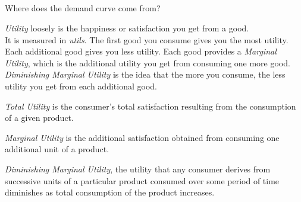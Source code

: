 \subsection{}
Where does the demand curve come from?
\begin{definition}
    \emph{Utility} loosely is the happiness or satisfaction you get from a good.\\
    It is measured in \emph{utils}. The first good you consume gives you the most utility.
    Each additional good gives you less utility. Each good provides a \emph{Marginal Utility}, 
    which is the additional utility you get from consuming one more good. \emph{Diminishing Marginal Utility} 
    is the idea that the more you consume, the less utility you get from each additional good.
\end{definition}
\begin{definition}
    \emph{Total Utility} is the consumer's total satisfaction resulting from the consumption of a given product.
\end{definition}
\begin{definition}
    \emph{Marginal Utility} is the additional satisfaction obtained from consuming one additional unit of a product.
\end{definition}
\begin{definition}
    \emph{Diminishing Marginal Utility}, the utility that any consumer derives from successive units of a particular product consumed
    over some period of time diminishes as total consumption of the product increases.
\end{definition}

